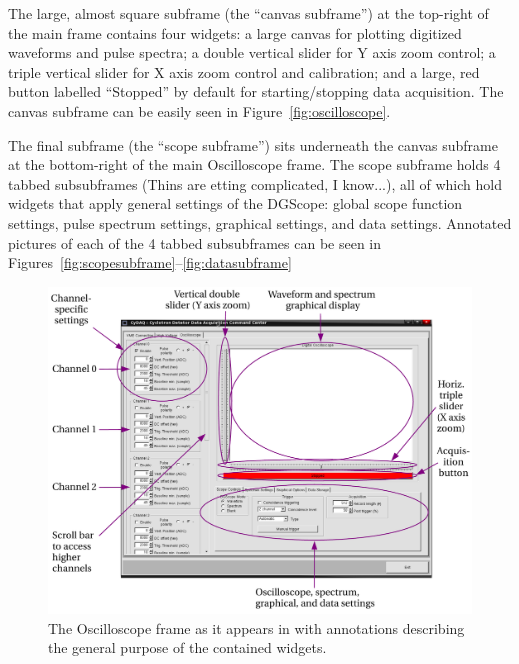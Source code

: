 The large, almost square subframe (the ``canvas subframe'') at the
top-right of the main frame contains four widgets: a large canvas for
plotting digitized waveforms and pulse spectra; a double vertical
slider for Y axis zoom control; a triple vertical slider for X axis
zoom control and calibration; and a large, red button labelled
``Stopped'' by default for starting/stopping data acquisition. The
canvas subframe can be easily seen in Figure~\ref{fig:oscilloscope}.

The final subframe (the ``scope subframe'') sits underneath the canvas
subframe at the bottom-right of the main Oscilloscope frame. The scope
subframe holds 4 tabbed subsubframes (Thins are etting complicated, I
know...), all of which hold widgets that apply general settings of the
DGScope: global scope function settings, pulse spectrum settings,
graphical settings, and data settings. Annotated pictures of each of
the 4 tabbed subsubframes can be seen in
Figures~\ref{fig:scopesubframe}--\ref{fig:datasubframe}

\begin{figure}
  \centering
  \includegraphics[width=6in]{images/OscilloscopeFrame}
  \caption{The Oscilloscope frame as it appears in
    \ADAQ with annotations describing the general
    purpose of the contained widgets.}
  \label{fig:oscilloscopeframe}
\end{figure}

